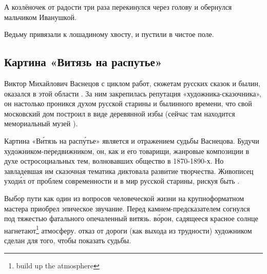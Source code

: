 А козлёночек от радости три раза перекинулся через голову и обернулся мальчиком Иванушкой.

Ведьму привязали к лошадиному хвосту, и пустили в чистое поле.


\subsection{Картина «Витязь на распутье»}

Виктор Михайлович Васнецов с циклом работ,  сюжетам русских сказок и былин, оказался  в этой области . За ним закрепилась репутация «художника-сказочника», он настолько проникся духом русской старины и былинного времени, что свой московский дом построил в виде деревянной избы (сейчас там находится мемориальный музей ).

Картина «В\'{и}тязь на расп\'{у}тье»  является и отражением судьбы Васнецова.
Будучи  художником-передвижником, он, как и его товарищи,  жанровые композиции в духе остросоциальных тем, волновавших общество в 1870-1890-х.
Но завладевшая им сказочная тематика диктовала  развитие творчества. Живописец уход\'{и}л от проблем современности и  в мир русской старины, рискуя быть .

Выбор пути как один из  вопросов человеческой жизни на крупноформатном  мастера приобрел эпическое звучание.
Перед камнем-предсказателем согнулся под тяжестью фатального  опечаленный витязь.  в\'{о}рон, садящееся красное солнце нагнетают\footnote{build up the atmosphere} атмосферу.  отказ от  дороги (как выхода из трудности) художником сделан для того, чтобы показать  судьбы.